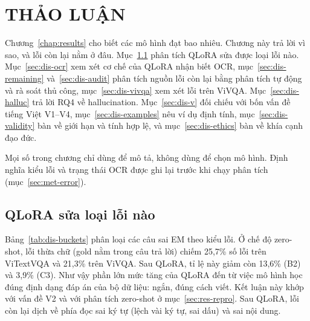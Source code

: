 
\chapter{THẢO LUẬN}
\label{chap:discussion}

\ifpdf
    \graphicspath{{Chapter7/Figs/Raster/}{Chapter7/Figs/PDF/}{Chapter7/Figs/}}
\else
    \graphicspath{{Chapter7/Figs/Vector/}{Chapter7/Figs/}}
\fi

Chương~\ref{chap:results} cho biết các mô hình đạt bao nhiêu. Chương này trả lời
vì sao, và lỗi còn lại nằm ở đâu. Mục~\ref{sec:dis-qlora} phân tích QLoRA sửa
được loại lỗi nào. Mục~\ref{sec:dis-ocr} xem xét cơ chế của QLoRA nhận biết OCR,
mục~\ref{sec:dis-remaining} và~\ref{sec:dis-audit} phân tích nguồn lỗi còn lại
bằng phân tích tự động và rà soát thủ công, mục~\ref{sec:dis-vivqa} xem xét lỗi trên
ViVQA. Mục~\ref{sec:dis-halluc} trả lời RQ4 về hallucination. Mục~\ref{sec:dis-v}
đối chiếu với bốn vấn đề tiếng Việt V1--V4, mục~\ref{sec:dis-examples} nêu ví dụ
định tính, mục~\ref{sec:dis-validity} bàn về giới hạn và tính hợp lệ, và
mục~\ref{sec:dis-ethics} bàn về khía cạnh đạo đức.

Mọi số trong chương chỉ dùng để mô tả, không dùng để chọn mô hình. Định nghĩa
kiểu lỗi và trạng thái OCR được ghi lại trước khi chạy phân tích
(mục~\ref{sec:met-error}).

\section{QLoRA sửa loại lỗi nào}
\label{sec:dis-qlora}

Bảng~\ref{tab:dis-buckets} phân loại các câu sai EM theo kiểu lỗi. Ở chế độ
zero-shot, lỗi thừa chữ (gold nằm trong câu trả lời) chiếm 25,7\% số lỗi trên
ViTextVQA và 21,3\% trên ViVQA. Sau QLoRA, tỉ lệ này giảm còn 13,6\% (B2) và 3,9\%
(C3). Như vậy phần lớn mức tăng của QLoRA đến từ việc mô hình học đúng định dạng
đáp án của bộ dữ liệu: ngắn, đúng cách viết. Kết luận này khớp với vấn đề V2 và
với phân tích zero-shot ở mục~\ref{sec:res-repro}. Sau QLoRA, lỗi còn lại dịch về
phía đọc sai ký tự (lệch vài ký tự, sai dấu) và sai nội dung.

